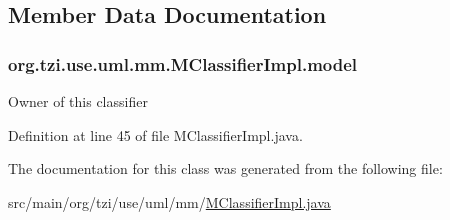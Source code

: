 \subsection{Member Data Documentation}
\hypertarget{classorg_1_1tzi_1_1use_1_1uml_1_1mm_1_1_m_classifier_impl_a12a5d3d4ce833383eca8ef43a73e2484}{
\subsubsection[{model}]{ org.\-tzi.\-use.\-uml.\-mm.\-M\-Classifier\-Impl.\-model\hspace{0.3cm}{\ttfamily [protected]}}}\label{classorg_1_1tzi_1_1use_1_1uml_1_1mm_1_1_m_classifier_impl_a12a5d3d4ce833383eca8ef43a73e2484}
Owner of this classifier 

Definition at line 45 of file M\-Classifier\-Impl.\-java.



The documentation for this class was generated from the following file\-:\begin{DoxyCompactItemize}
\item 
src/main/org/tzi/use/uml/mm/\hyperlink{_m_classifier_impl_8java}{M\-Classifier\-Impl.\-java}\end{DoxyCompactItemize}
